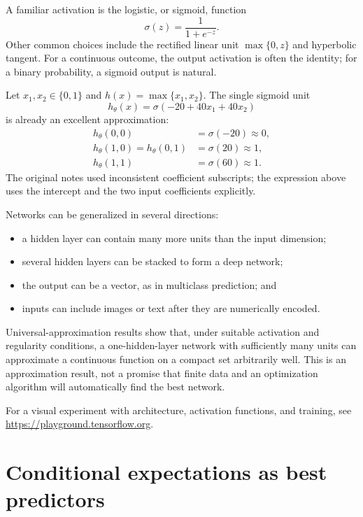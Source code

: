 A familiar activation is the logistic, or sigmoid, function
\begin{equation}
  \sigma(z)=\frac{1}{1+e^{-z}}.
  \label{eq:nn-sigmoid}
\end{equation}
Other common choices include the rectified linear unit
$\max\{0,z\}$ and hyperbolic tangent.  For a continuous outcome, the output
activation is often the identity; for a binary probability, a sigmoid output
is natural.

\begin{example}
Let $x_1,x_2\in\{0,1\}$ and $h(x)=\max\{x_1,x_2\}$.  The single sigmoid unit
\[
  h_\theta(x)=\sigma(-20+40x_1+40x_2)
\]
is already an excellent approximation:
\begin{align*}
  h_\theta(0,0)&=\sigma(-20)\approx0,\\
  h_\theta(1,0)=h_\theta(0,1)&=\sigma(20)\approx1,\\
  h_\theta(1,1)&=\sigma(60)\approx1.
\end{align*}
The original notes used inconsistent coefficient subscripts; the expression
above uses the intercept and the two input coefficients explicitly.
\end{example}

Networks can be generalized in several directions:
\begin{itemize}
  \item a hidden layer can contain many more units than the input dimension;
  \item several hidden layers can be stacked to form a deep network;
  \item the output can be a vector, as in multiclass prediction; and
  \item inputs can include images or text after they are numerically encoded.
\end{itemize}
Universal-approximation results show that, under suitable activation and
regularity conditions, a one-hidden-layer network with sufficiently many units
can approximate a continuous function on a compact set arbitrarily well.  This
is an approximation result, not a promise that finite data and an optimization
algorithm will automatically find the best network.

For a visual experiment with architecture, activation functions, and training,
see \url{https://playground.tensorflow.org}.

\section{Conditional expectations as best predictors}
\label{sec:nn-best-predictor}

